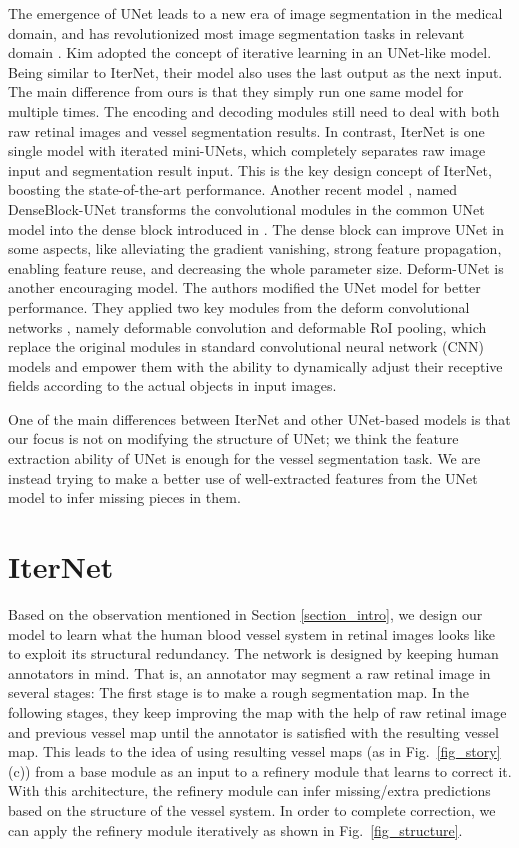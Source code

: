 \documentclass[10pt,twocolumn,letterpaper]{article}
\begin{document}
The emergence of UNet \cite{UNet} leads to a new era of image segmentation in the medical domain, and has revolutionized most image segmentation tasks in relevant domain \cite{8341481,8681706,8589312,DBLP:journals/corr/abs-1903-00923,TANG2019289}. Kim \etal \cite{8036917} adopted the concept of iterative learning in an UNet-like model. Being similar to IterNet, their model also uses the last output as the next input. The main difference from ours is that they simply run one same model for multiple times. The encoding and decoding modules still need to deal with both raw retinal images and vessel segmentation results. In contrast, IterNet is one single model with iterated mini-UNets, which completely separates raw image input and segmentation result input. This is the key design concept of IterNet, boosting the state-of-the-art performance. Another recent model \cite{8697107, 8379359}, named DenseBlock-UNet transforms the convolutional modules in the common UNet model into the dense block introduced in \cite{8099726}. The dense block can improve UNet in some aspects, like alleviating the gradient vanishing, strong feature propagation, enabling feature reuse, and decreasing the whole parameter size. Deform-UNet \cite{JIN2019} is another encouraging model. The authors modified the UNet model for better performance. They applied two key modules from the deform convolutional networks \cite{dai17dcn}, namely deformable convolution and deformable RoI pooling, which replace the original modules in standard convolutional neural network (CNN) models and empower them with the ability to dynamically adjust their receptive fields according to the actual objects in input images. 

One of the main differences between IterNet and other UNet-based models is that our focus is not on modifying the structure of UNet; we think the feature extraction ability of UNet is enough for the vessel segmentation task. We are instead trying to make a better use of well-extracted features from the UNet model to infer missing pieces in them.

\section{IterNet}\label{section_method}

Based on the observation mentioned in Section \ref{section_intro}, we design our model to learn what the human blood vessel system in retinal images looks like to exploit its structural redundancy. The network is designed by keeping human annotators in mind. That is, an annotator may segment a raw retinal image in  several stages: The first stage is to make a rough segmentation map. In the following stages, they keep improving the map with the help of raw retinal image and previous vessel map until the annotator is satisfied with the resulting vessel map.
This leads to the idea of using resulting vessel maps (as in Fig.~\ref{fig_story}(c)) from a base module as an input to a refinery module that learns to correct it. With this architecture, the refinery module can infer missing/extra predictions based on the structure of the vessel system. In order to complete correction, we can apply the refinery module iteratively as shown in Fig.~\ref{fig_structure}. 
\end{document}
